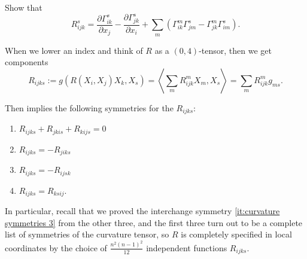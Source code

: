 \begin{exercise}
	Show that
	\[
		R_{ijk}^s = \frac{\partial \Gamma_{ik}^s}{\partial x_j} - \frac{\partial \Gamma_{jk}^s}{\partial x_i} + \sum_m(\Gamma_{ik}^m \Gamma_{jm}^s - \Gamma_{jk}^m \Gamma_{im}^s).
	\]
\end{exercise}

When we lower an index and think of $R$ as a $(0,4)$-tensor, then we get components
\[
	R_{ijks} := g(R(X_i,X_j)X_k,X_s) = \left\langle \sum_{m}R_{ijk}^m X_m, X_s \right\rangle = \sum_m R_{ijk}^m g_{ms}.
\]

Then  implies the following symmetries for the $R_{ijks}$:

\begin{corollary}\label{cor:symmetries of curvature components}
	\begin{enumerate}
		\item $R_{ijks} + R_{jkis} + R_{kijs} = 0$
		\item $R_{ijks} = -R_{jiks}$
		\item $R_{ijks} = -R_{ijsk}$
		\item $R_{ijks} = R_{ksij}$.
	\end{enumerate}
\end{corollary}

In particular, recall that we proved the interchange symmetry \ref{it:curvature symmetries 3} from the other three, and the first three turn out to be a complete list of symmetries of the curvature tensor, so $R$ is completely specified in local coordinates by the choice of $\frac{n^2(n-1)^2}{12}$ independent functions $R_{ijks}$.